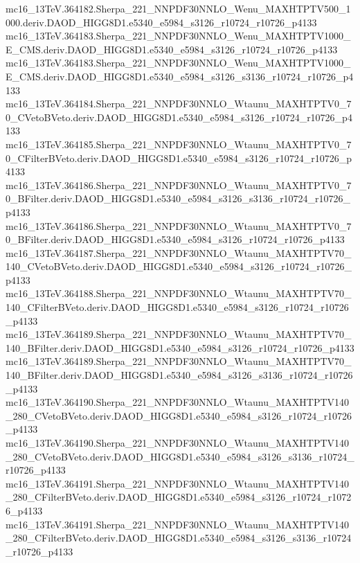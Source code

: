 mc16_13TeV.364182.Sherpa_221_NNPDF30NNLO_Wenu_MAXHTPTV500_1000.deriv.DAOD_HIGG8D1.e5340_e5984_s3126_r10724_r10726_p4133 \\
mc16_13TeV.364183.Sherpa_221_NNPDF30NNLO_Wenu_MAXHTPTV1000_E_CMS.deriv.DAOD_HIGG8D1.e5340_e5984_s3126_r10724_r10726_p4133 \\
mc16_13TeV.364183.Sherpa_221_NNPDF30NNLO_Wenu_MAXHTPTV1000_E_CMS.deriv.DAOD_HIGG8D1.e5340_e5984_s3126_s3136_r10724_r10726_p4133 \\
mc16_13TeV.364184.Sherpa_221_NNPDF30NNLO_Wtaunu_MAXHTPTV0_70_CVetoBVeto.deriv.DAOD_HIGG8D1.e5340_e5984_s3126_r10724_r10726_p4133 \\
mc16_13TeV.364185.Sherpa_221_NNPDF30NNLO_Wtaunu_MAXHTPTV0_70_CFilterBVeto.deriv.DAOD_HIGG8D1.e5340_e5984_s3126_r10724_r10726_p4133 \\
mc16_13TeV.364186.Sherpa_221_NNPDF30NNLO_Wtaunu_MAXHTPTV0_70_BFilter.deriv.DAOD_HIGG8D1.e5340_e5984_s3126_s3136_r10724_r10726_p4133 \\
mc16_13TeV.364186.Sherpa_221_NNPDF30NNLO_Wtaunu_MAXHTPTV0_70_BFilter.deriv.DAOD_HIGG8D1.e5340_e5984_s3126_r10724_r10726_p4133 \\
mc16_13TeV.364187.Sherpa_221_NNPDF30NNLO_Wtaunu_MAXHTPTV70_140_CVetoBVeto.deriv.DAOD_HIGG8D1.e5340_e5984_s3126_r10724_r10726_p4133 \\
mc16_13TeV.364188.Sherpa_221_NNPDF30NNLO_Wtaunu_MAXHTPTV70_140_CFilterBVeto.deriv.DAOD_HIGG8D1.e5340_e5984_s3126_r10724_r10726_p4133 \\
mc16_13TeV.364189.Sherpa_221_NNPDF30NNLO_Wtaunu_MAXHTPTV70_140_BFilter.deriv.DAOD_HIGG8D1.e5340_e5984_s3126_r10724_r10726_p4133 \\
mc16_13TeV.364189.Sherpa_221_NNPDF30NNLO_Wtaunu_MAXHTPTV70_140_BFilter.deriv.DAOD_HIGG8D1.e5340_e5984_s3126_s3136_r10724_r10726_p4133 \\
mc16_13TeV.364190.Sherpa_221_NNPDF30NNLO_Wtaunu_MAXHTPTV140_280_CVetoBVeto.deriv.DAOD_HIGG8D1.e5340_e5984_s3126_r10724_r10726_p4133 \\
mc16_13TeV.364190.Sherpa_221_NNPDF30NNLO_Wtaunu_MAXHTPTV140_280_CVetoBVeto.deriv.DAOD_HIGG8D1.e5340_e5984_s3126_s3136_r10724_r10726_p4133 \\
mc16_13TeV.364191.Sherpa_221_NNPDF30NNLO_Wtaunu_MAXHTPTV140_280_CFilterBVeto.deriv.DAOD_HIGG8D1.e5340_e5984_s3126_r10724_r10726_p4133 \\
mc16_13TeV.364191.Sherpa_221_NNPDF30NNLO_Wtaunu_MAXHTPTV140_280_CFilterBVeto.deriv.DAOD_HIGG8D1.e5340_e5984_s3126_s3136_r10724_r10726_p4133 \\
